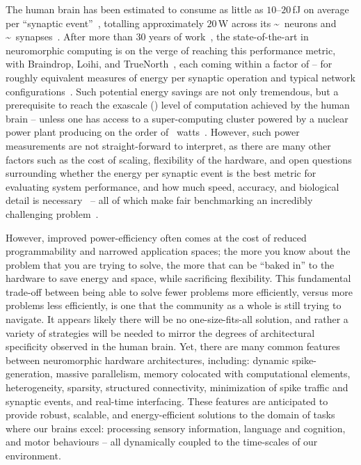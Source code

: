 The human brain has been estimated to consume as little as $10$--$20$\,fJ on average per ``synaptic event''~\citep{cassidy2014real, boahen2017neuromorph}, totalling approximately $20$\,W across its {\textasciitilde{}}~neurons and {\textasciitilde{}}~synapses~\citep{koch2014}.
After more than $30$ years of work~\citep{cassidy2013design}, the state-of-the-art in neuromorphic computing is on the verge of reaching this performance metric, with Braindrop, Loihi, and TrueNorth~\citep{merolla2014million}, each coming within a factor of -- for roughly equivalent measures of energy per synaptic operation and typical network configurations~\citep{braindrop2019}.
Such potential energy savings are not only tremendous, but a prerequisite to reach the exascale () level of computation achieved by the human brain -- unless one has access to a super-computing cluster powered by a nuclear power plant producing on the order of ~watts~\citep{furber2012build, neurogrid2014}.
However, such power measurements are not straight-forward to interpret, as there are many other factors such as the cost of scaling, flexibility of the hardware, and open questions surrounding whether the energy per synaptic event is the best metric for evaluating system performance, and how much speed, accuracy, and biological detail is necessary~\citep{eliasmith2013build} -- all of which make fair benchmarking an incredibly challenging problem~\citep{stewart2015closed}.

However, improved power-efficiency often comes at the cost of reduced programmability and narrowed application spaces;
the more you know about the problem that you are trying to solve, the more that can be ``baked in'' to the hardware to save energy and space, while sacrificing flexibility.
This fundamental trade-off between being able to solve fewer problems more efficiently, versus more problems less efficiently, is one that the community as a whole is still trying to navigate.
It appears likely there will be no one-size-fits-all solution, and rather a variety of strategies will be needed to mirror the degrees of architectural specificity observed in the human brain.
Yet, there are many common features between neuromorphic hardware architectures, including: dynamic spike-generation, massive parallelism, memory colocated with computational elements, heterogeneity, sparsity, structured connectivity, minimization of spike traffic and synaptic events, and real-time interfacing.
These features are anticipated to provide robust, scalable, and energy-efficient solutions to the domain of tasks where our brains excel: processing sensory information, language and cognition, and motor behaviours -- all dynamically coupled to the time-scales of our environment.

